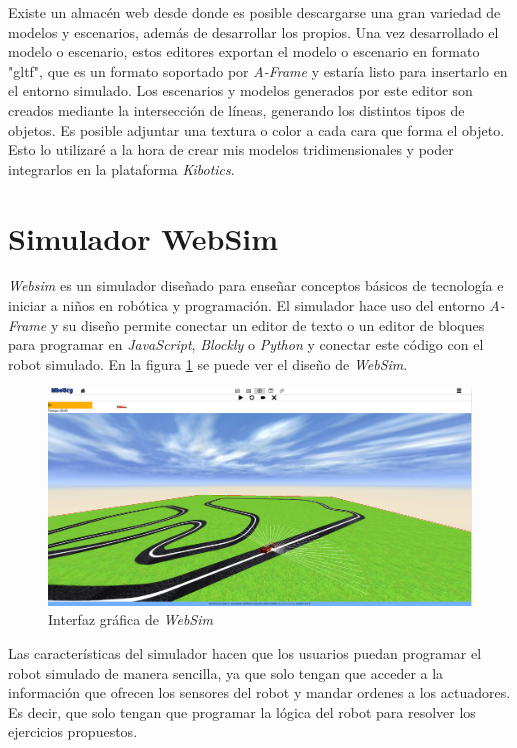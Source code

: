 Existe un almacén web desde donde es posible descargarse una gran variedad de modelos y escenarios, además de desarrollar los propios. Una vez desarrollado el modelo o escenario, estos editores exportan el modelo o escenario en formato "gltf", que es un formato soportado por \textit{A-Frame} y estaría listo para insertarlo en el entorno simulado.\newline
Los escenarios y modelos generados por este editor son creados mediante la intersección de líneas, generando los distintos tipos de objetos. Es posible adjuntar una textura o color a cada cara que forma el objeto. Esto lo utilizaré a la hora de crear mis modelos tridimensionales y poder integrarlos en la plataforma \textit{Kibotics}.


\section{Simulador WebSim}

\textit{Websim} es un simulador diseñado para enseñar conceptos básicos de tecnología e iniciar a niños en robótica y programación. 
El simulador hace uso del entorno \textit{A-Frame} y su diseño permite conectar un editor de texto o un editor de bloques para  programar en \textit{JavaScript}, \textit{Blockly} o \textit{Python} y conectar este código con el robot simulado.  En la figura \ref{fig:websim} se puede ver el diseño de \textit{WebSim}.
    

\begin{figure}[H]
    \centering
    \includegraphics[width=1\textwidth]{img/websim.png}
    \caption{Interfaz gráfica de \textit{WebSim}} \label{fig:websim}
\end{figure}

Las características del simulador hacen que los usuarios puedan programar el robot simulado de manera sencilla, ya que solo tengan que acceder a la información que ofrecen los sensores del robot y mandar ordenes a los actuadores. Es decir, que solo tengan que programar la lógica del robot para resolver los ejercicios propuestos. 

